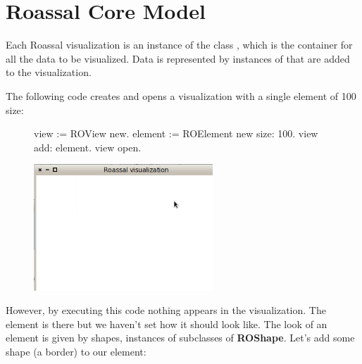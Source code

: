 \documentclass[a4paper,10pt,twoside]{book}
\begin{document}

\section{Roassal Core Model}



Each Roassal visualization is an instance of the class , which is the container for all the data to be visualized.
Data is represented by instances of  that are added to the visualization.  %

The following code creates and opens a visualization with a single element of 100 size:


\begin{figure}[H]
      \begin{minipage}[t]{0.5\textwidth}
      \vspace{0pt}
\begin{code}{}
view := ROView new.
element := ROElement new size: 100.
view add: element.
view open.
\end{code}
   \end{minipage}
   \hfill
   \begin{minipage}[t]{0.6\textwidth}
      \vspace{0pt} \raggedright
       \centering
		\includegraphics[width=0.6\textwidth]{ex1}
   \end{minipage}
\label{fig:ex1}
\end{figure}

However, by executing this code nothing appears in the visualization. The element is there but we haven't set how it should look like. The look of an element is given by shapes, instances of subclasses of \textbf{ROShape}. Let's add some shape (a border) to our element: 
\end{document}
